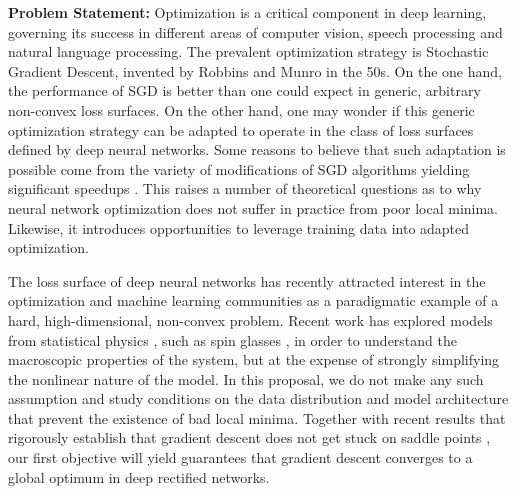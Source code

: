 \documentclass[10pt]{article}
\begin{document}
\vspace{0.5cm}
\noindent
\textbf{Problem Statement:}
Optimization is a critical component in deep learning, governing its success in different areas of computer vision, speech processing and natural language processing. The prevalent optimization strategy is Stochastic Gradient Descent, invented by Robbins and Munro in the 50s. On the one hand, the performance of SGD is better than one could expect 
in generic, arbitrary non-convex loss surfaces. On the other hand, one may wonder if this generic optimization strategy can be adapted to operate in the class of loss surfaces defined by deep neural networks. Some reasons to believe that such adaptation is possible come from the 
variety of modifications of SGD algorithms yielding significant speedups \cite{duchi2011adaptive, hinton2012lecture, ioffe2015batch, kingma2014adam}.
This raises a number of theoretical questions as to why neural network optimization does not suffer in practice from poor local minima. Likewise, it introduces opportunities to leverage training data into adapted optimization. 

The loss surface of deep neural networks has recently attracted interest 
in the optimization and machine learning communities as a paradigmatic example of 
a hard, high-dimensional, non-convex problem. 
Recent work has explored models from statistical physics \cite{dauphin2014identifying}, such as spin glasses \cite{choromanska2015loss}, 
in order to understand the macroscopic properties of the system, but at the expense of strongly simplifying the nonlinear nature of the model.
In this proposal, we do not make any such assumption and study conditions 
on the data distribution and model architecture that prevent the existence 
of bad local minima. Together with 
recent results that rigorously establish that gradient descent does not 
get stuck on saddle points \cite{lee2016gradient}, our first objective will yield guarantees that gradient descent converges
to a global optimum in deep rectified networks. 
\end{document}
